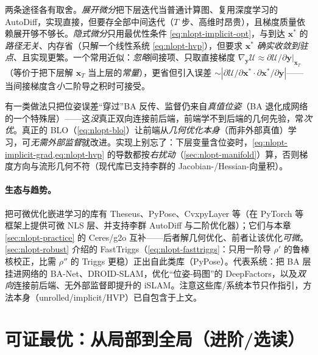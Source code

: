 \begin{insight}[展开 vs 隐式：存计算图还是解线性系统]
两条途径各有取舍。\emph{展开微分}把下层迭代当普通计算图、复用深度学习的 AutoDiff，实现直接，但要存全部中间迭代（$T$ 步、高维时昂贵），且梯度质量依赖展开够不够长。\emph{隐式微分}只用最优性条件 \cref{eq:nlopt-implicit-opt}，与到达 $\mathbf{x}^*$ 的\emph{路径无关}、内存省（只解一个线性系统 \cref{eq:nlopt-hvp}），但要求 $\mathbf{x}^*$ \emph{确实收敛到驻点}、且实现更繁。一个常用近似：\emph{忽略}间接项、只取直接梯度 $\nabla_{\mathbf{y}}\mathcal{U}\approx\partial\mathcal{U}/\partial\mathbf{y}|_{\mathbf{x}_T}$（等价于把下层解 $\mathbf{x}_T$ 当上层的\emph{常量}），更省但引入误差 $\sim|\partial\mathcal{U}/\partial\mathbf{x}^*\cdot\partial\mathbf{x}^*/\partial\mathbf{y}|$——当间接梯度含\emph{小}二阶导之积时可接受。
\end{insight}

\begin{pitfall}
有一类做法只把位姿误差“穿过”BA 反传、监督仍来自\emph{真值位姿}（BA 退化成网络的一个特殊层）——这\emph{没}真正双向连接前后端，前端学不到后端的几何先验，常\emph{次优}。真正的 BLO（\cref{eq:nlopt-blo}）让前端从\emph{几何优化本身}（而非外部真值）学习，可\emph{无需外部监督}就改进。实现上别忘了：下层变量含位姿时，\cref{eq:nlopt-implicit-grad,eq:nlopt-hvp} 的导数都按\emph{右扰动}（\cref{sec:nlopt-manifold}）算，否则梯度方向与流形几何不符（现代库已支持李群的 Jacobian-/Hessian-向量积）。
\end{pitfall}

\paragraph{生态与趋势。}\cite{carlone2026handbook,agarwal2012ceres}
把可微优化嵌进学习的库有 Theseus、PyPose、CvxpyLayer 等（在 PyTorch 等框架上提供可微 NLS 层、并支持李群 AutoDiff 与二阶优化器）；它们与本章 \cref{sec:nlopt-practice} 的 Ceres/g2o 互补——后者解几何优化、前者让该优化\emph{可微}。\cref{sec:nlopt-robust} 介绍的 FastTriggs（\cref{eq:nlopt-fasttriggs}：只用一阶导 $\rho'$ 的鲁棒核校正，比需 $\rho''$ 的 Triggs 更稳）正出自此类库（PyPose）。代表系统：把 BA 层挂进网络的 BA-Net、DROID-SLAM，优化“位姿-码图”的 DeepFactors，以及\emph{双向}连接前后端、无外部监督即提升的 iSLAM。注意这些库/系统本节只作指引，方法本身（unrolled/implicit/HVP）已自包含于上文。

\section{可证最优：从局部到全局（进阶/选读）}
\label{sec:nlopt-certifiable}

